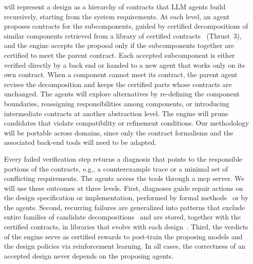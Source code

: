  \sysname will represent a design as a hierarchy of contracts that LLM agents build recursively, starting from the system requirements. At each level, an agent proposes contracts for the subcomponents, guided by certified decompositions of similar components retrieved from a library of certified contracts{~\cite{iannopollo2014library,wang2022hierarchical}} (Thrust~3), and the engine accepts the proposal only if the subcomponents together are certified to meet the parent contract. Each accepted subcomponent is either verified directly by a back end or handed to a new agent that works only on its own contract. When a component cannot meet its contract, the parent agent revises the decomposition and keeps the certified parts whose contracts are unchanged. {The agents will explore alternatives by re-defining the component boundaries, reassigning responsibilities among components, or introducing intermediate contracts at another abstraction level. The engine will prune candidates that violate compatibility or refinement conditions.} Our methodology will be portable across domains, since only the contract formalisms and the associated back-end tools will need to be adapted. 

 Every failed verification step returns a diagnosis that points to the responsible portions of the contracts, e.g., a counterexample trace or a minimal set of conflicting requirements. The agents access the tools through a \gls{mcp} server. We will use these outcomes at three levels. First, diagnoses guide repair actions on the design specification or implementation, performed by formal methods~\cite{xiao2026memocode} or by the agents. Second, recurring failures are generalized into patterns that exclude entire families of candidate decompositions~\cite{xiao2024contrarc} and are stored, together with the certified contracts, in libraries that evolve with each design~\cite{xiao2026acies}. Third, the verdicts of the engine serve as certified rewards to post-train the proposing models and the design policies via reinforcement learning. In all cases, the correctness of an accepted design never depends on the proposing agents.

